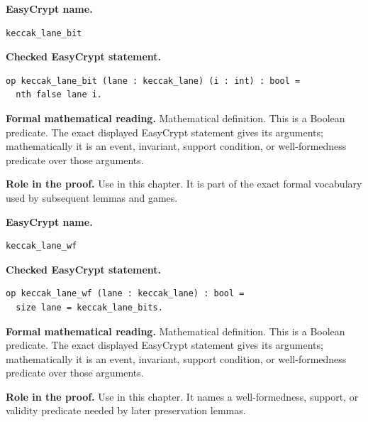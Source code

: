 \begin{formaldefinition}
\noindent\textbf{EasyCrypt name.}
\begin{lstlisting}[language=EasyCrypt,basicstyle=\ttfamily\scriptsize]
keccak_lane_bit
\end{lstlisting}
\noindent\textbf{Checked EasyCrypt statement.}
\begin{lstlisting}[language=EasyCrypt,basicstyle=\ttfamily\scriptsize]
op keccak_lane_bit (lane : keccak_lane) (i : int) : bool =
  nth false lane i.
\end{lstlisting}
\noindent\textbf{Formal mathematical reading.}
Mathematical definition. This is a Boolean predicate.  The exact displayed EasyCrypt statement gives its arguments; mathematically it is an event, invariant, support condition, or well-formedness predicate over those arguments.

\noindent\textbf{Role in the proof.}
Use in this chapter. It is part of the exact formal vocabulary used by subsequent lemmas and games.

\end{formaldefinition}

\begin{formaldefinition}
\noindent\textbf{EasyCrypt name.}
\begin{lstlisting}[language=EasyCrypt,basicstyle=\ttfamily\scriptsize]
keccak_lane_wf
\end{lstlisting}
\noindent\textbf{Checked EasyCrypt statement.}
\begin{lstlisting}[language=EasyCrypt,basicstyle=\ttfamily\scriptsize]
op keccak_lane_wf (lane : keccak_lane) : bool =
  size lane = keccak_lane_bits.
\end{lstlisting}
\noindent\textbf{Formal mathematical reading.}
Mathematical definition. This is a Boolean predicate.  The exact displayed EasyCrypt statement gives its arguments; mathematically it is an event, invariant, support condition, or well-formedness predicate over those arguments.

\noindent\textbf{Role in the proof.}
Use in this chapter. It names a well-formedness, support, or validity predicate needed by later preservation lemmas.

\end{formaldefinition}

